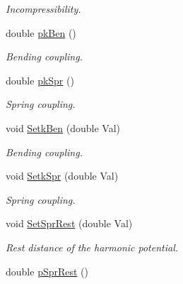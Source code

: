 \begin{DoxyCompactItemize}
\begin{DoxyCompactList}\small\item\em Incompressibility. \end{DoxyCompactList}\item 
double \hyperlink{classVarData_a395cfa5f68437606051e29df1759e371}{pk\+Ben} ()\hypertarget{classVarData_a395cfa5f68437606051e29df1759e371}{}\label{classVarData_a395cfa5f68437606051e29df1759e371}

\begin{DoxyCompactList}\small\item\em Bending coupling. \end{DoxyCompactList}\item 
double \hyperlink{classVarData_a16f3b01ba84886cbaf53fa1238c434f3}{pk\+Spr} ()\hypertarget{classVarData_a16f3b01ba84886cbaf53fa1238c434f3}{}\label{classVarData_a16f3b01ba84886cbaf53fa1238c434f3}

\begin{DoxyCompactList}\small\item\em Spring coupling. \end{DoxyCompactList}\item 
void \hyperlink{classVarData_a8b0df96451468c9ee33e780d2415d41b}{Setk\+Ben} (double Val)\hypertarget{classVarData_a8b0df96451468c9ee33e780d2415d41b}{}\label{classVarData_a8b0df96451468c9ee33e780d2415d41b}

\begin{DoxyCompactList}\small\item\em Bending coupling. \end{DoxyCompactList}\item 
void \hyperlink{classVarData_aa06753ad7a63b8c66f00d123a41abab6}{Setk\+Spr} (double Val)\hypertarget{classVarData_aa06753ad7a63b8c66f00d123a41abab6}{}\label{classVarData_aa06753ad7a63b8c66f00d123a41abab6}

\begin{DoxyCompactList}\small\item\em Spring coupling. \end{DoxyCompactList}\item 
void \hyperlink{classVarData_af7a6e7b2d5b68ac853cf2c9438d5ebda}{Set\+Spr\+Rest} (double Val)\hypertarget{classVarData_af7a6e7b2d5b68ac853cf2c9438d5ebda}{}\label{classVarData_af7a6e7b2d5b68ac853cf2c9438d5ebda}

\begin{DoxyCompactList}\small\item\em Rest distance of the harmonic potential. \end{DoxyCompactList}\item 
double \hyperlink{classVarData_ad180facca71ad48ae3ce77052bf22957}{p\+Spr\+Rest} ()\hypertarget{classVarData_ad180facca71ad48ae3ce77052bf22957}{}\label{classVarData_ad180facca71ad48ae3ce77052bf22957}


\end{DoxyCompactItemize}
